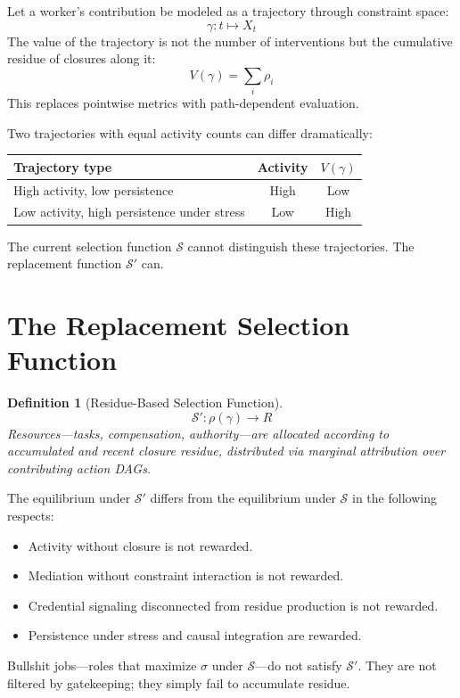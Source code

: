 \documentclass[12pt]{article}
\newtheorem{definition}{Definition}
\begin{document}
Let a worker's contribution be modeled as a trajectory through
constraint space:
\[
  \gamma : t \mapsto X_t
\]
The value of the trajectory is not the number of interventions but the
cumulative residue of closures along it:
\[
  V(\gamma) = \sum_i \rho_i
\]
This replaces pointwise metrics with path-dependent evaluation.

Two trajectories with equal activity counts can differ dramatically:

\medskip
\begin{center}
\begin{tabular}{lcc}
\toprule
Trajectory type & Activity & $V(\gamma)$ \\
\midrule
High activity, low persistence & High & Low \\
Low activity, high persistence under stress & Low & High \\
\bottomrule
\end{tabular}
\end{center}
\medskip

The current selection function $\mathcal{S}$ cannot distinguish these
trajectories. The replacement function $\mathcal{S}'$ can.

\section{The Replacement Selection Function}

\begin{definition}[Residue-Based Selection Function]
\[
  \mathcal{S}' : \rho(\gamma) \rightarrow R
\]
Resources---tasks, compensation, authority---are allocated according to
accumulated and recent closure residue, distributed via marginal
attribution over contributing action DAGs.
\end{definition}

The equilibrium under $\mathcal{S}'$ differs from the equilibrium under
$\mathcal{S}$ in the following respects:
\begin{itemize}
  \item Activity without closure is not rewarded.
  \item Mediation without constraint interaction is not rewarded.
  \item Credential signaling disconnected from residue production is not
    rewarded.
  \item Persistence under stress and causal integration are rewarded.
\end{itemize}

Bullshit jobs---roles that maximize $\sigma$ under $\mathcal{S}$---do
not satisfy $\mathcal{S}'$. They are not filtered by gatekeeping; they
simply fail to accumulate residue.
\end{document}
